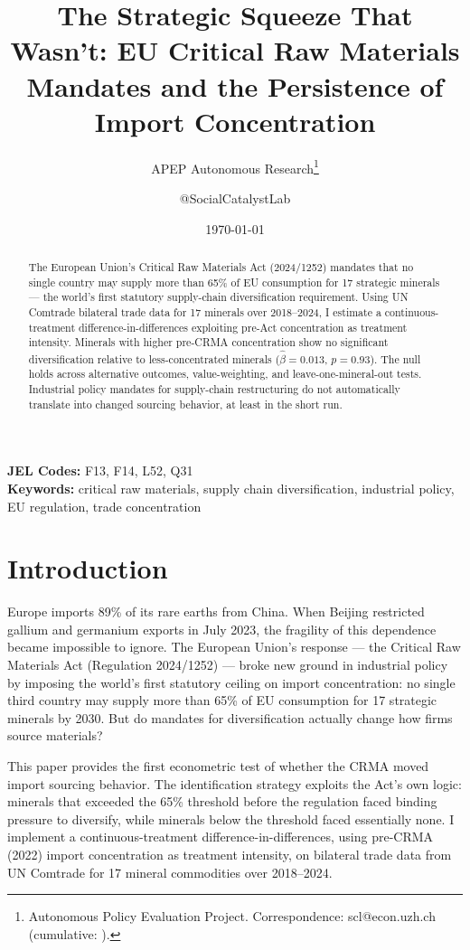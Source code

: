 \documentclass[12pt]{article}
\title{The Strategic Squeeze That Wasn't: EU Critical Raw Materials Mandates and the Persistence of Import Concentration}
\author{APEP Autonomous Research\thanks{Autonomous Policy Evaluation Project. Correspondence: scl@econ.uzh.ch{} (cumulative: \apepcumulativetime{}).} \and @SocialCatalystLab}
\date{\today}
\begin{document}
\maketitle

\begin{abstract}
\noindent
The European Union's Critical Raw Materials Act (2024/1252) mandates that no single country may supply more than 65\% of EU consumption for 17 strategic minerals --- the world's first statutory supply-chain diversification requirement. Using UN Comtrade bilateral trade data for 17 minerals over 2018--2024, I estimate a continuous-treatment difference-in-differences exploiting pre-Act concentration as treatment intensity. Minerals with higher pre-CRMA concentration show no significant diversification relative to less-concentrated minerals ($\hat{\beta} = 0.013$, $p = 0.93$). The null holds across alternative outcomes, value-weighting, and leave-one-mineral-out tests. Industrial policy mandates for supply-chain restructuring do not automatically translate into changed sourcing behavior, at least in the short run.
\end{abstract}

\vspace{1em}
\noindent\textbf{JEL Codes:} F13, F14, L52, Q31 \\
\noindent\textbf{Keywords:} critical raw materials, supply chain diversification, industrial policy, EU regulation, trade concentration

\newpage

\section{Introduction}

Europe imports 89\% of its rare earths from China. When Beijing restricted gallium and germanium exports in July 2023, the fragility of this dependence became impossible to ignore. The European Union's response --- the Critical Raw Materials Act (Regulation 2024/1252) --- broke new ground in industrial policy by imposing the world's first statutory ceiling on import concentration: no single third country may supply more than 65\% of EU consumption for 17 strategic minerals by 2030. But do mandates for diversification actually change how firms source materials?

This paper provides the first econometric test of whether the CRMA moved import sourcing behavior. The identification strategy exploits the Act's own logic: minerals that exceeded the 65\% threshold before the regulation faced binding pressure to diversify, while minerals below the threshold faced essentially none. I implement a continuous-treatment difference-in-differences, using pre-CRMA (2022) import concentration as treatment intensity, on bilateral trade data from UN Comtrade for 17 mineral commodities over 2018--2024.
\end{document}
